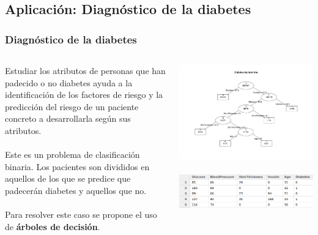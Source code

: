 \documentclass[8pt]{beamer}
\begin{document}
  \subsection{Aplicación: Diagnóstico de la diabetes}
    \begin{frame}
      \frametitle{Diagnóstico de la diabetes}
      \begin{columns}[c]
       \begin{column}{.5\textwidth}
	 \justifying
	 Estudiar los atributos de personas que han padecido o no diabetes ayuda a
         la identificación de los factores de riesgo y la
         predicción del riesgo de un paciente concreto a desarrollarla según sus atributos.
         \\~\\
         Este es un problema de clasificación binaria. Los pacientes son divididos en aquellos
         de los que se predice que padecerán diabetes y aquellos que no.
         \\~\\
         Para resolver este caso se propone el uso de \textbf{árboles de decisión}. 
         
       \end{column}
       \begin{column}{.5\textwidth}
	  \begin{center}
	  \includegraphics[width=\textwidth]{imgs/tree.pdf} %
	  \\~\\
	  \includegraphics[width=\textwidth]{imgs/pima-indians-diabetes.png} %

	  \end{center}
       \end{column}
      \end{columns}
    \end{frame}
    
\end{document}
